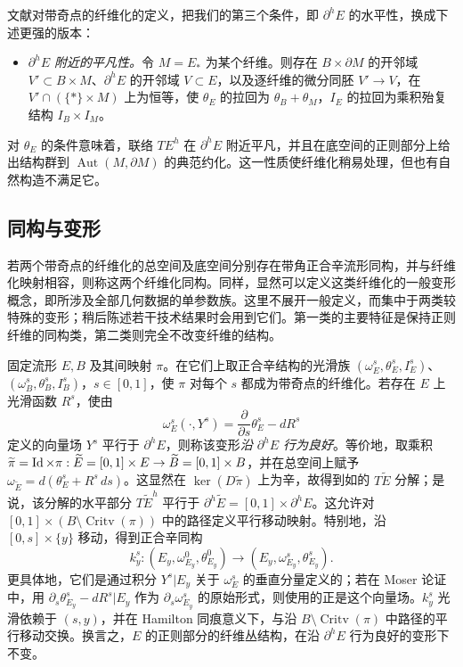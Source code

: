 \begin{note}\label{st:15.2}
文献对带奇点的纤维化的定义，把我们的第三个条件，即 $\partial^hE$ 的水平性，换成下述更强的版本：
\begin{itemize}
\item \emph{$\partial^hE$ 附近的平凡性。}令 $M=E_*$ 为某个纤维。则存在 $B\times\partial M$ 的开邻域 $V'\subset B\times M$、$\partial^hE$ 的开邻域 $V\subset E$，以及逐纤维的微分同胚 $V'\to V$，在 $V'\cap(\{*\}\times M)$ 上为恒等，使 $\theta_E$ 的拉回为 $\theta_B+\theta_M$，$I_E$ 的拉回为乘积殆复结构 $I_B\times I_M$。
\end{itemize}
对 $\theta_E$ 的条件意味着，联络 $TE^h$ 在 $\partial^hE$ 附近平凡，并且在底空间的正则部分上给出结构群到 $\operatorname{Aut}(M,\partial M)$ 的典范约化。这一性质使纤维化稍易处理，但也有自然构造不满足它。
\end{note}

\subsection{同构与变形}\label{sec:15b}
若两个带奇点的纤维化的总空间及底空间分别存在带角正合辛流形同构，并与纤维化映射相容，则称这两个纤维化同构。同样，显然可以定义这类纤维化的一般变形概念，即所涉及全部几何数据的单参数族。这里不展开一般定义，而集中于两类较特殊的变形；稍后陈述若干技术结果时会用到它们。第一类的主要特征是保持正则纤维的同构类，第二类则完全不改变纤维的结构。

固定流形 $E,B$ 及其间映射 $\pi$。在它们上取正合辛结构的光滑族 $(\omega_E^s,\theta_E^s,I_E^s)$、$(\omega_B^s,\theta_B^s,I_B^s)$，$s\in[0,1]$，使 $\pi$ 对每个 $s$ 都成为带奇点的纤维化。若存在 $E$ 上光滑函数 $R^s$，使由
\begin{equation}\label{eq:15.4}
\omega_E^s(\cdot,Y^s)=\frac{\partial}{\partial s}\theta_E^s-dR^s
\end{equation}
定义的向量场 $Y^s$ 平行于 $\partial^hE$，则称该变形\emph{沿 $\partial^hE$ 行为良好}。等价地，取乘积 $\widetilde\pi=\operatorname{Id}\times\pi:\widetilde E=[0,1]\times E\to\widetilde B=[0,1]\times B$，并在总空间上赋予 $\omega_{\widetilde E}=d(\theta_E^s+R^s\,ds)$。这显然在 $\ker(D\widetilde\pi)$ 上为辛，故得到如的 $T\widetilde E$ 分解；是说，该分解的水平部分 $T\widetilde E^h$ 平行于 $\partial^h\widetilde E=[0,1]\times\partial^hE$。这允许对 $[0,1]\times(B\setminus\operatorname{Critv}(\pi))$ 中的路径定义平行移动映射。特别地，沿 $[0,s]\times\{y\}$ 移动，得到正合辛同构
\begin{equation}\label{eq:15.5}
k_y^s:(E_y,\omega_{E_y}^0,\theta_{E_y}^0)\longrightarrow
(E_y,\omega_{E_y}^s,\theta_{E_y}^s).
\end{equation}
更具体地，它们是通过积分 $Y^s|E_y$ 关于 $\omega_E^s$ 的垂直分量定义的；若在 Moser 论证中，用 $\partial_s\theta_{E_y}^s-dR^s|E_y$ 作为 $\partial_s\omega_{E_y}^s$ 的原始形式，则使用的正是这个向量场。$k_y^s$ 光滑依赖于 $(s,y)$，并在 Hamilton 同痕意义下，与沿 $B\setminus\operatorname{Critv}(\pi)$ 中路径的平行移动交换。换言之，$E$ 的正则部分的纤维丛结构，在沿 $\partial^hE$ 行为良好的变形下不变。


